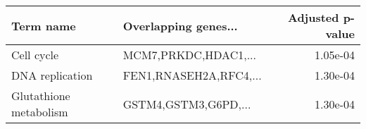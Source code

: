 \begin{tabular}{llr}
\toprule
             Term name &   Overlapping genes... &  Adjusted p-value \\
\midrule
            Cell cycle &   MCM7,PRKDC,HDAC1,... &          1.05e-04 \\
       DNA replication & FEN1,RNASEH2A,RFC4,... &          1.30e-04 \\
Glutathione metabolism &   GSTM4,GSTM3,G6PD,... &          1.30e-04 \\
\bottomrule
\end{tabular}
